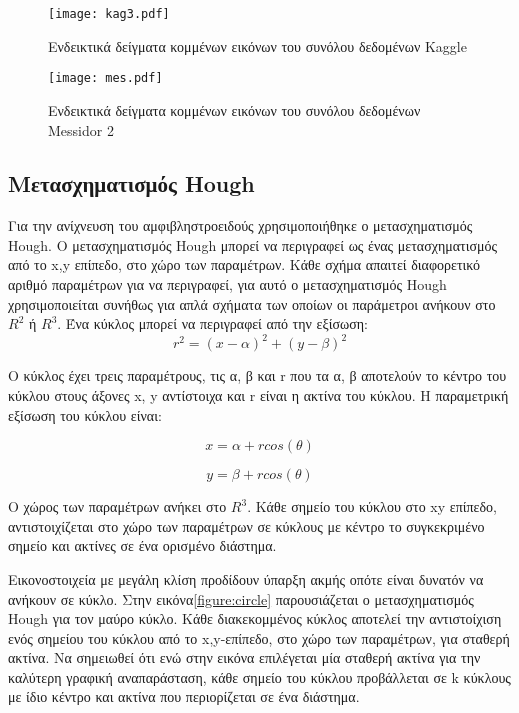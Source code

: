 \begin{figure}[!h]
    \centering
      \texttt{[image: kag3.pdf]} \caption{Eνδεικτικά δείγματα κομμένων εικόνων του συνόλου δεδομένων Kaggle}
\label{figure:kag3}  
\end{figure}

\begin{figure}[!h]
    \centering
      \texttt{[image: mes.pdf]} \caption{Eνδεικτικά δείγματα κομμένων εικόνων του συνόλου δεδομένων Messidor 2}
\label{figure:mes3}  
\end{figure}

\subsection{Μετασχηματισμός Hough} 
\label{sec:4.2.2}

Για την ανίχνευση του αμφιβληστροειδούς χρησιμοποιήθηκε ο μετασχηματισμός Hough\cite{Pedersen}. Ο μετασχηματισμός Hough μπορεί να περιγραφεί ως ένας μετασχηματισμός από το x,y επίπεδο, στο χώρο των παραμέτρων. Κάθε σχήμα απαιτεί διαφορετικό αριθμό παραμέτρων για να περιγραφεί, για αυτό ο μετασχηματισμός Hough χρησιμοποιείται συνήθως για απλά σχήματα των οποίων οι παράμετροι ανήκουν στο $R^2$ ή $R^3$. 
Ένα κύκλος μπορεί να περιγραφεί από την εξίσωση:
\begin{equation} \label{eq:circle}
r^2 =  (x - α)^2 + (y - β)^2
\end{equation}

Ο κύκλος έχει τρεις παραμέτρους, τις α, β και r που τα α, β αποτελούν το κέντρο του κύκλου στους άξονες x, y αντίστοιχα και r είναι η ακτίνα του κύκλου. Η παραμετρική εξίσωση του κύκλου είναι:

\begin{equation} \label{eq:par1}
x = α + r cos(\theta)
\end{equation}

\begin{equation} \label{eq:par2}
y = β + r cos(\theta)
\end{equation}

O χώρος των παραμέτρων ανήκει στο $R^3$. Κάθε σημείο του κύκλου στο xy επίπεδο, αντιστοιχίζεται στο χώρο των παραμέτρων σε κύκλους με κέντρο το συγκεκριμένο σημείο και ακτίνες σε ένα ορισμένο διάστημα. 


Εικονοστοιχεία με μεγάλη κλίση προδίδουν ύπαρξη ακμής οπότε είναι δυνατόν να ανήκουν σε κύκλο. Στην εικόνα\ref{figure:circle} παρουσιάζεται ο μετασχηματισμός Hough για τον μαύρο κύκλο. Κάθε διακεκομμένος κύκλος αποτελεί την αντιστοίχιση ενός σημείου του κύκλου από το x,y-επίπεδο, στο χώρο των παραμέτρων, για σταθερή ακτίνα. Να σημειωθεί ότι ενώ στην εικόνα επιλέγεται μία σταθερή ακτίνα για την καλύτερη γραφική αναπαράσταση, κάθε σημείο του κύκλου προβάλλεται σε k κύκλους με ίδιο κέντρο και ακτίνα που περιορίζεται σε ένα διάστημα.


